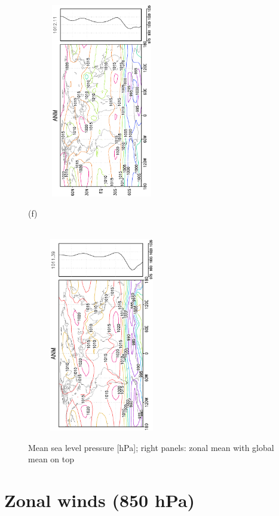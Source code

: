 \documentclass[12pt,a4paper,twoside,openright,headinclude,liststotoc,bibtotoc]{scrreprt}
\begin{document}
\begin{figure}[H]
{\includegraphics[height=8.5cm,width=6.5cm,angle=-90]
{eps/zonalfinaltmpres151.eps}
}
\parbox{8.5cm}{\hspace{0.25cm}\begin{scriptsize}(f)\end{scriptsize} \vspace{-0.7cm} \\
\includegraphics[height=8.5cm,width=6.5cm,angle=-90]
{eps/zonalt21finaltmmslp.eps}
}
\caption[Mean sea level pressure]{Mean sea level pressure [hPa]; right panels: zonal mean with global mean on top}
\label{img:mslp}
\end{figure}

\vspace{-0.4cm}
\section{Zonal winds (850 hPa)}
\vspace{-0.4cm}
\end{document}
